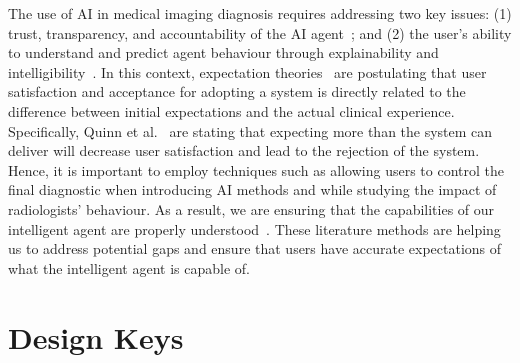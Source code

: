 The use of \ac{AI} in medical imaging diagnosis requires addressing two key issues:
(1) trust, transparency, and accountability of the \ac{AI} agent~\cite{10.1145/3290605.3300233}; and
(2) the user's ability to understand and predict agent behaviour through explainability and intelligibility~\cite{10.1145/3301275.3302289, gunning2017explainable, 10.1007/978-3-319-99740-7_1, miller2018explanation}.
In this context, expectation theories~\cite{Kocielnik:2019:YAI:3290605.3300641, leung2019health} are postulating that user satisfaction and acceptance for adopting a system is directly related to the difference between initial expectations and the actual clinical experience.
Specifically, Quinn et al.~\cite{QUINN2022102158} are stating that expecting more than the system can deliver will decrease user satisfaction and lead to the rejection of the system.
Hence, it is important to employ techniques such as allowing users to control the final diagnostic when introducing \ac{AI} methods and while studying the impact of radiologists' behaviour.
As a result, we are ensuring that the capabilities of our intelligent agent are properly understood~\cite{CALISTO2021102607}.
These literature methods are helping us to address potential gaps and ensure that users have accurate expectations of what the intelligent agent is capable of.

\section{Design Keys}
\label{sec:chap005003}

